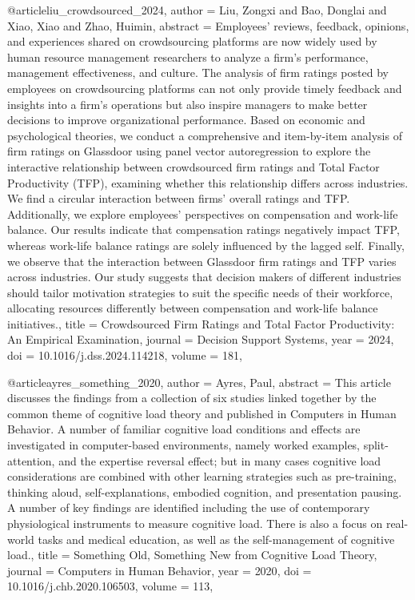 @article{liu_crowdsourced_2024,
  author = {Liu, Zongxi and Bao, Donglai and Xiao, Xiao and Zhao, Huimin},
  abstract = {Employees' reviews, feedback, opinions, and experiences shared on crowdsourcing platforms are now widely used by human resource management researchers to analyze a firm's performance, management effectiveness, and culture. The analysis of firm ratings posted by employees on crowdsourcing platforms can not only provide timely feedback and insights into a firm's operations but also inspire managers to make better decisions to improve organizational performance. Based on economic and psychological theories, we conduct a comprehensive and item-by-item analysis of firm ratings on Glassdoor using panel vector autoregression to explore the interactive relationship between crowdsourced firm ratings and Total Factor Productivity (TFP), examining whether this relationship differs across industries. We find a circular interaction between firms' overall ratings and TFP. Additionally, we explore employees' perspectives on compensation and work-life balance. Our results indicate that compensation ratings negatively impact TFP, whereas work-life balance ratings are solely influenced by the lagged self. Finally, we observe that the interaction between Glassdoor firm ratings and TFP varies across industries. Our study suggests that decision makers of different industries should tailor motivation strategies to suit the specific needs of their workforce, allocating resources differently between compensation and work-life balance initiatives.},
  title = {{Crowdsourced} {Firm} {Ratings} {and} {Total} {Factor} {Productivity}: {An} {Empirical} {Examination}},
  journal = {Decision Support Systems},
  year = {2024},
  doi = {10.1016/j.dss.2024.114218},
  volume = {181},
}

@article{ayres_something_2020,
  author = {Ayres, Paul},
  abstract = {This article discusses the findings from a collection of six studies linked together by the common theme of cognitive load theory and published in Computers in Human Behavior. A number of familiar cognitive load conditions and effects are investigated in computer-based environments, namely worked examples, split-attention, and the expertise reversal effect; but in many cases cognitive load considerations are combined with other learning strategies such as pre-training, thinking aloud, self-explanations, embodied cognition, and presentation pausing. A number of key findings are identified including the use of contemporary physiological instruments to measure cognitive load. There is also a focus on real-world tasks and medical education, as well as the self-management of cognitive load.},
  title = {{Something} {Old}, {Something} {New} {from} {Cognitive} {Load} {Theory}},
  journal = {Computers in Human Behavior},
  year = {2020},
  doi = {10.1016/j.chb.2020.106503},
  volume = {113},
}

